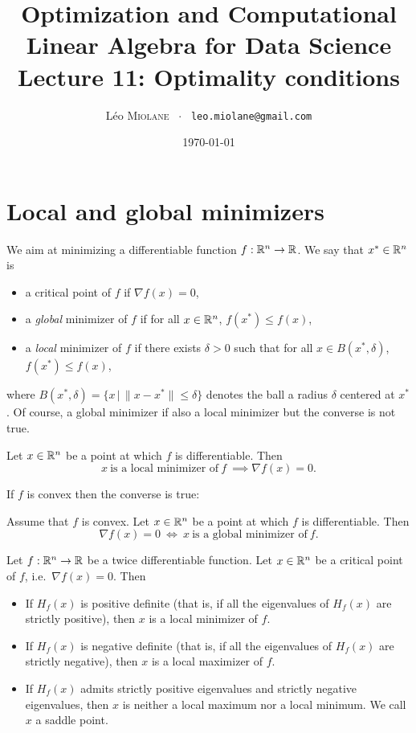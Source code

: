 \documentclass[11pt,nocut]{article}
\title{\vspace{-2.0cm}%
	Optimization and Computational Linear Algebra for Data Science\\
Lecture 11: Optimality conditions}
\author{Léo \textsc{Miolane} \ $\cdot$ \ \texttt{leo.miolane@gmail.com}}
\date{\today}
\begin{document}
\maketitle


\section{Local and global minimizers}

We aim at minimizing a differentiable function $f: \mathbb{R}^n \to \mathbb{R}$.
We say that $x^* \in \mathbb{R}^n$ is
\begin{itemize}
	\item a critical point of $f$ if $\nabla f(x) = 0$,
	\item a \emph{global} minimizer of $f$ if for all $x \in \mathbb{R}^n$, $f(x^*) \leq f(x)$,
	\item a \emph{local} minimizer of $f$ if there exists $\delta > 0$ such that for all $x \in B(x^*,\delta)$, $f(x^*) \leq f(x)$,
\end{itemize}
where $B(x^*,\delta) = \{x \, | \, \|x-x^*\| \leq \delta \}$ denotes the ball a radius $\delta$ centered at $x^*$.
Of course, a global minimizer if also a local minimizer but the converse is not true.

\begin{proposition}\label{prop:zero_grad}
	Let $x \in \mathbb{R}^n$ be a point at which $f$ is differentiable. 
	Then
	$$
	x \ \text{is a local minimizer of} \ f \ \implies \nabla f(x) = 0.
	$$
\end{proposition}

If $f$ is convex then the converse is true:

\begin{proposition}\label{prop:zero_grad_convex}
	Assume that $f$ is convex.
	Let $x \in \mathbb{R}^n$ be a point at which $f$ is differentiable. 
	Then
	$$
	\nabla f(x) = 0 \ \Longleftrightarrow \ x \ \text{is a global minimizer of} \ f.
	$$
\end{proposition}

\begin{proposition}
	Let $f:\mathbb{R}^n \to \mathbb{R}$ be a twice differentiable function. Let $x \in \mathbb{R}^n$ be a critical point of $f$, i.e.\ $\nabla f(x) = 0$. Then
	\begin{itemize}
		\item If $H_f(x)$ is positive definite (that is, if all the eigenvalues of $H_f(x)$ are strictly positive), then $x$ is a local minimizer of $f$.
		\item If $H_f(x)$ is negative definite (that is, if all the eigenvalues of $H_f(x)$ are strictly negative), then $x$ is a local maximizer of $f$.
		\item If $H_f(x)$ admits strictly positive eigenvalues and strictly negative eigenvalues, then $x$ is neither a local maximum nor a local minimum. We call $x$ a saddle point.
	\end{itemize}
\end{proposition}
\end{document}
